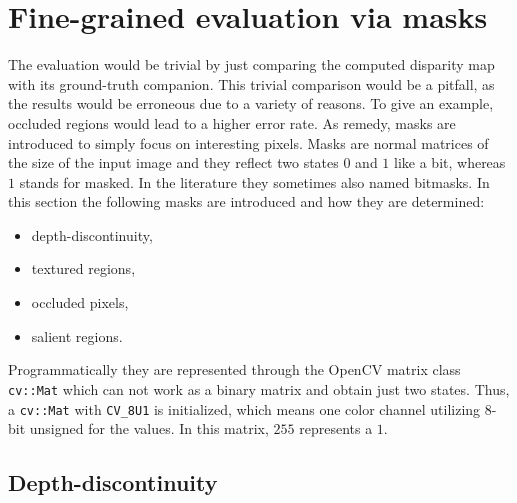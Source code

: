 \section{Fine-grained evaluation via masks}

The evaluation would be trivial by just comparing the computed disparity map with its ground-truth companion.
This trivial comparison would be a pitfall, as the results would be erroneous due to a variety of reasons.
To give an example, occluded regions would lead to a higher error rate.
As remedy, masks are introduced to simply focus on interesting pixels.
Masks are normal matrices of the size of the input image and they reflect two states $0$ and $1$ like a bit, whereas $1$ stands for masked.
In the literature they sometimes also named bitmasks.
In this section the following masks are introduced and how they are determined:

\begin{itemize}
  \item depth-discontinuity,
  \item textured regions,
  \item occluded pixels,
  \item salient regions.
\end{itemize}

\noindent Programmatically they are represented through the OpenCV matrix class \texttt{cv::Mat} which can not work as a binary matrix and obtain just two states.
Thus, a \texttt{cv::Mat} with \texttt{CV\_8U1} is initialized, which means one color channel utilizing 8-bit unsigned for the values.
In this matrix, $255$ represents a $1$.

\subsection*{Depth-discontinuity}

